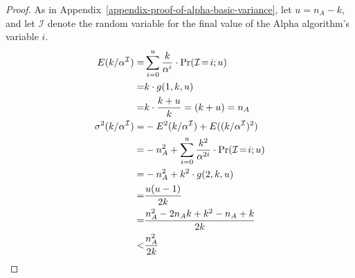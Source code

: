 \documentclass{article}
\begin{document}
\begin{proof}
As in Appendix~\ref{appendix-proof-of-alpha-basic-variance}, let
 $u = n_A - k$, and let $\mathcal{I}$ denote the random variable
for the final value of the Alpha algorithm's variable $i$.
\begin{align*}
 E(k/\alpha^{\mathcal{I}})  = & \sum_{i=0}^{u}\frac{k}{\alpha^i} \cdot \mathrm{Pr}(\mathcal{I}\!=\!i ; u) \\ = & k \cdot g(1,k,u) \\
= & k\cdot\frac{k+u}{k} = (k+u) = n_A \\
\vspace{0.75em}
 \sigma^2(k/\alpha^{\mathcal{I}}) = & - E^2(k/\alpha^{\mathcal{I}}) + E((k/\alpha^{\mathcal{I}})^2) \\
 = & -n_A^2 + \sum_{i=0}^{u}\frac{k^2}{\alpha^{2i}} \cdot \mathrm{Pr}(\mathcal{I}\!=\!i ; u) \\ 
  = & -n_A^2 + k^2 \cdot g(2,k,u) \\
  = & \frac{u(u-1)}{2k} \\
  = & \frac{n_A^2-2n_Ak+k^2-n_A+k}{2k} \\
  < & \frac{n_A^2}{2k}
\end{align*}
\end{proof}
\end{document}
